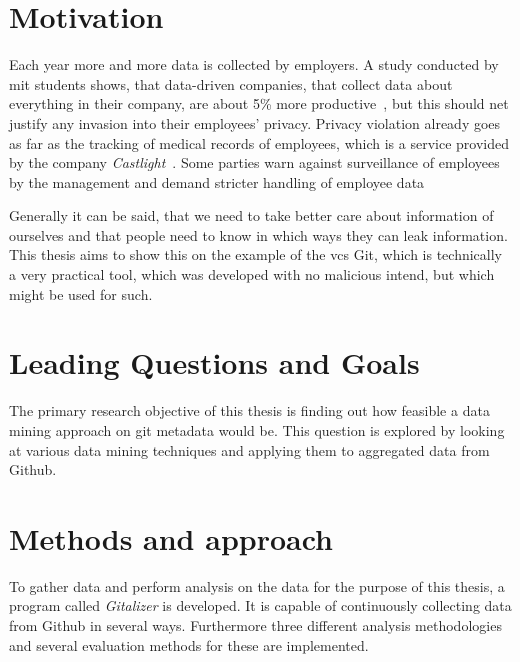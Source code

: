 \section{Motivation}
Each year more and more data is collected by employers.
A study conducted by \ac{mit} students shows, that data-driven companies, that collect data about everything in their company, are about 5\% more productive~\cite{article:management-revolution}, but this should net justify any invasion into their employees' privacy.
Privacy violation already goes as far as the tracking of medical records of employees, which is a service provided by the company \emph{Castlight}~\cite{article:medical-data}.
Some parties warn against surveillance of employees by the management and demand stricter handling of employee data~\cite{article:vermessung-belegschaft}

Generally it can be said, that we need to take better care about information of ourselves and that people need to know in which ways they can leak information.
This thesis aims to show this on the example of the \ac{vcs} Git, which is technically a very practical tool, which was developed with no malicious intend, but which might be used for such.

\section{Leading Questions and Goals}

The primary research objective of this thesis is finding out how feasible a data mining approach on git metadata would be.
This question is explored by looking at various data mining techniques and applying them to aggregated data from Github.

\section{Methods and approach}

To gather data and perform analysis on the data for the purpose of this thesis, a program called \emph{Gitalizer} is developed.
It is capable of continuously collecting data from Github in several ways.
Furthermore three different analysis methodologies and several evaluation methods for these are implemented.
